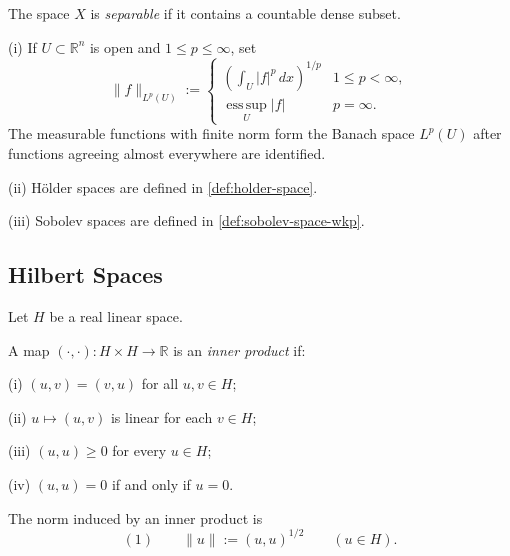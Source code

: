 \begin{definition}
\label{def:separable-space}
The space $X$ is \textit{separable} if it contains a countable dense subset.
\end{definition}

\begin{example}
\label{ex:banach-space-examples-lp-holder-sobolev}
(i) If $U\subset\mathbb R^n$ is open and $1\leq p\leq\infty$, set
\[
\|f\|_{L^p(U)}:=
\begin{cases}
\left(\int_U|f|^p\,dx\right)^{1/p} & 1\leq p<\infty,\\
\operatorname*{ess\,sup}_U|f| & p=\infty.
\end{cases}
\]
The measurable functions with finite norm form the Banach space $L^p(U)$ after functions agreeing almost everywhere are identified.

(ii) H\"older spaces are defined in \cref{def:holder-space}.

(iii) Sobolev spaces are defined in \cref{def:sobolev-space-wkp}.
\end{example}

\subsection{Hilbert Spaces}
\label{sec:hilbert-spaces}

Let $H$ be a real linear space.

\begin{definition}
\label{def:inner-product}
A map $(\cdot,\cdot):H\times H\to\mathbb R$ is an \textit{inner product} if:

(i) $(u,v)=(v,u)$ for all $u,v\in H$;

(ii) $u\mapsto(u,v)$ is linear for each $v\in H$;

(iii) $(u,u)\geq0$ for every $u\in H$;

(iv) $(u,u)=0$ if and only if $u=0$.
\end{definition}

\begin{definition}
\label{def:norm-from-inner-product}
The norm induced by an inner product is
\[
(1)\qquad \|u\|:=(u,u)^{1/2}\qquad(u\in H).
\]
\end{definition}

